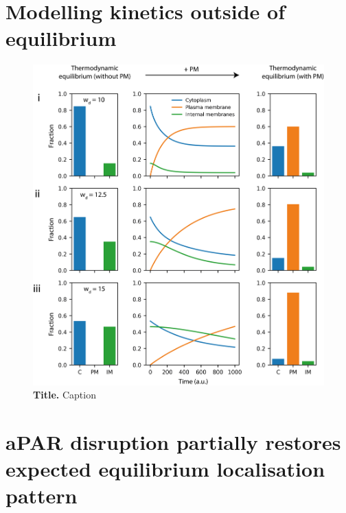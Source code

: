 \documentclass[12pt]{"report"}
\newcommand{\mycaption}[2]{\caption[#1]{\textbf{#1.} #2}}
\begin{document}


\section{Modelling kinetics outside of equilibrium}


\begin{figure}[!h]
\includegraphics[scale=0.95]{three_surface_kinetic}
\setlength{\abovecaptionskip}{20pt}
\centering
\mycaption{Title}{Caption}
\label{fig:three_surface_kinetic}
\end{figure}


\section{aPAR disruption partially restores expected equilibrium localisation pattern}
\end{document}
